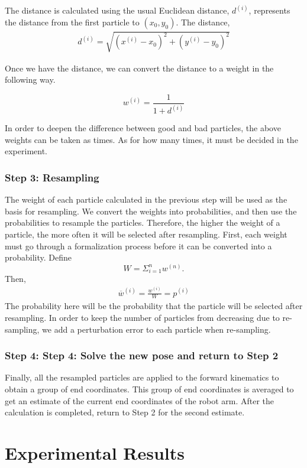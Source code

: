 \documentclass[journal,article,submit,pdftex,moreauthors]{Definitions/mdpi}
\begin{document}
The distance is calculated using the usual Euclidean distance,  $d^{(i)}$, represents the distance from the first particle to $(x_0, y_0)$. The distance,
\begin{align}
d^{(i)}=\sqrt{(x^{(i)}-x_0)^2+(y^{(i)}-y_0)^2}
\end{align}

Once we have the distance, we can convert the distance to a weight in the following way.

$$w^{(i)}=\frac{1}{1+d^{(i)}}$$

In order to deepen the difference between good and bad particles, the above weights can be taken as  times. As for how many times, it must be decided in the experiment.


\subsubsection{Step 3: Resampling}
The weight of each particle calculated in the previous step will be used as the basis for resampling. We convert the weights into probabilities, and then use the probabilities to resample the particles. Therefore, the higher the weight of a particle, the more often it will be selected after resampling.
First, each weight must go through a formalization process before it can be converted into a probability.
Define
$$W=\Sigma_{i=1}^{n}w^{(n)}.$$
Then,
\begin{align}
\overline{w}^{(i)}=\frac{w^{(i)}}{W}=p^{(i)}
\end{align}
The probability here will be the probability that the particle will be selected after resampling. In order to keep the number of particles from decreasing due to re-sampling, we add a perturbation error to each particle when re-sampling.

\subsubsection{Step 4: Step 4: Solve the new pose and return to Step 2}
Finally, all the resampled particles are applied to the forward kinematics to obtain a group of end coordinates. This group of end coordinates is averaged to get an estimate of the current end coordinates of the robot arm. After the calculation is completed, return to Step 2 for the second estimate.

\section{Experimental Results}
\end{document}
